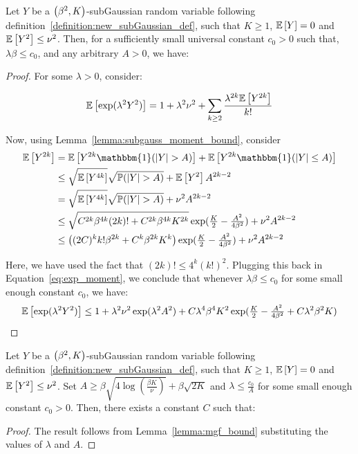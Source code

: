 \begin{lemma}
    \label{lemma:mgf_bound}
    Let $Y$ be a $\left(\beta^{2}, K\right)$-subGaussian random variable following definition~\ref{definition:new_subGaussian_def}, such that $K\geq 1$, $\mathbb{E}\left[Y\right] = 0$ and $\mathbb{E}\left[Y^2\right] \leq \nu^2$. Then, for a sufficiently small universal constant $c_{0} > 0$ such that, $\lambda \beta \leq c_0$, and any arbitrary $A > 0$, we have:
\end{lemma}
\begin{proof}
For some $\lambda > 0$, consider:

\begin{equation}\label{eq:exp_moment}
    \mathbb{E}\left[\exp(\lambda^2 Y^2)\right] = 1 + \lambda^2 \nu^2 + \sum_{k\geq 2} \frac{\lambda^{2k}\mathbb{E} \left[Y^{2k}\right]}{k!}
\end{equation}

Now, using Lemma~\ref{lemma:subgauss_moment_bound},  consider 
\begin{align}
    \bE \bbb{Y^{2k}} &= \bE \bbb{Y^{2k}\mathbbm{1}(|Y| > A)} + \bE\bbb{Y^{2k}\mathbbm{1}(|Y| \leq A)} \nonumber \\
&\leq \sqrt{\bE \bbb{Y^{4k}}}\sqrt{\bP(|Y| > A)} + \bE\bbb{Y^2} A^{2k-2} \nonumber \\
&= \sqrt{\bE \bbb{Y^{4k}}}\sqrt{\bP(|Y| > A)} + \nu^2 A^{2k-2} \nonumber \\
&\leq \sqrt{C^{2k}\beta^{4k}(2k)! + C^{2k}\beta^{4k}K^{2k}}\exp(\tfrac{K}{2}-\tfrac{A^2}{4\beta^2}) + \nu^2 A^{2k-2} \nonumber \\
&\leq \left((2C)^{k}k!\beta^{2k} + C^{k}\beta^{2k}K^k\right)\exp(\tfrac{K}{2}-\tfrac{A^2}{4\beta^2}) + \nu^2 A^{2k-2}
\end{align} 

Here, we have used the fact that $(2k)! \leq 4^k (k!)^2$. Plugging this back in Equation~\eqref{eq:exp_moment}, we conclude that whenever $\lambda\beta \leq c_0 $ for some small enough constant $c_0$, we have:
\begin{equation}
    \mathbb{E}\left[\exp(\lambda^2 Y^2)\right] \leq 1 + \lambda^2 \nu^2 \exp(\lambda^2 A^2) + C\lambda^4\beta^4K^2\exp(\tfrac{K}{2}-\tfrac{A^2}{4\beta^2} + C\lambda^2\beta^2K)
\end{equation}
\end{proof}
\begin{theorem}\label{theorem:mgf_bound_subgauss}
      Let $Y$ be a $\left(\beta^{2}, K\right)$-subGaussian random variable following definition~\ref{definition:new_subGaussian_def}, such that $K\geq 1$, $\mathbb{E}\left[Y\right] = 0$ and $\mathbb{E}\left[Y^{2}\right] \leq \nu^{2}$. Set $A \geq \beta \sqrt{4\log(\tfrac{\beta K}{\nu})} + \beta\sqrt{2 K}$ and $\lambda \leq \frac{c_0}{A}$ for some small enough constant $c_0 > 0$. Then, there exists a constant $C$ such that:
\end{theorem}
\begin{proof}

   The result follows from Lemma~\ref{lemma:mgf_bound} substituting the values of $\lambda$ and $A$. 
\end{proof}

